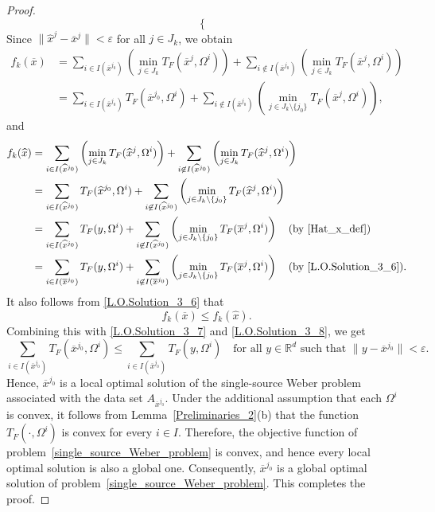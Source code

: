 \documentclass[sn-mathphys-num]{sn-jnl}%
\def\Hat{\widehat}
\theoremstyle{definition}
\begin{document}
\begin{proof}
\begin{equation}
\begin{cases}
	\end{cases}
    \end{equation}
    Since $\|\Hat{x}^j-\overline{x}^j\|<\varepsilon$ for all $j \in J_k$, we obtain
	\begin{equation}
		\label{L.O.Solution_3_7}
		\begin{aligned}
			f_k(\overline{x})&=\sum_{i \in I(\overline{x}^{j_0})}\left(\min_{j \in J_k}T_F(\overline{x}^j,\Omega^i) \right)+\sum_{i \not\in I(\overline{x}^{j_0})}\left(\min_{j \in J_k}T_F(\overline{x}^j,\Omega^i) \right)\\
			&=\sum_{i \in I(\overline{x}^{j_0})}T_F(\overline{x}^{j_0},\Omega^i) +\sum_{i \not\in I(\overline{x}^{j_0})}\left(\min_{j \in J_k\setminus \{j_0\}}T_F(\overline{x}^j,\Omega^i) \right),
		\end{aligned}
	\end{equation}
	and
	\begin{equation}
		\label{L.O.Solution_3_8}
		\begin{aligned}
			f_k(\Hat{x})    &=\sum_{i \in I(\Hat{x}^{j_0})}\left(\min_{j \in J_k}T_F(\Hat{x}^j,\Omega^i) \right)+\sum_{i \not\in I(\Hat{x}^{j_0})}\left(\min_{j \in J_k}T_F(\Hat{x}^j,\Omega^i) \right)\\
            &=\sum_{i \in I(\Hat{x}^{j_0})}T_F(\Hat{x}^{j_0},\Omega^i) +\sum_{i \not\in I(\Hat{x}^{j_0})}\left(\min_{j \in J_k\setminus\{j_0\}}T_F(\Hat{x}^j,\Omega^i) \right)\\
			&=\sum_{i \in I(\Hat{x}^{j_0})}T_F(y,\Omega^i)+\sum_{i \not\in I(\Hat{x}^{j_0})}\left(\min_{j \in J_k\setminus\{j_0\}}T_F(\overline{x}^j,\Omega^i) \right) \quad (\text{by \eqref{Hat_x_def}})\\
			&=\sum_{i \in I(\overline{x}^{j_0})}T_F(y,{\Omega^i})+\sum_{i \not\in I(\overline{x}^{j_0})}\left(\min_{j \in J_k \setminus \{j_0\}}T_F(\overline{x}^j,{\Omega^i}) \right) \quad (\text{by \eqref{L.O.Solution_3_6}}).
		\end{aligned}
	\end{equation}
    It also follows from \eqref{L.O.Solution_3_6} that
	\[
	f_k(\overline{x}) \le f_k(\Hat{x}).
	\]
	Combining this with \eqref{L.O.Solution_3_7} and \eqref{L.O.Solution_3_8}, we get
	\[
	\sum_{i \in I(\overline{x}^{j_0})} T_F(\overline{x}^{j_0},\Omega^i) \le \sum_{i \in I(\overline{x}^{j_0})} T_F(y,\Omega^i) 
	\quad \text{for all } y \in \mathbb{R}^d \text{ such that } \|y-\overline{x}^{j_0}\|<\varepsilon.
	\]
	Hence, $\overline{x}^{j_0}$ is a local optimal solution of the single-source Weber problem associated with the data set $A_{\overline{x}^{j_0}}$. Under the additional assumption that each $\Omega^i$ is convex, it follows from Lemma~\ref{Preliminaries_2}(b) that the function $T_F(\cdot,\Omega^i)$ is convex for every $i\in I$. Therefore, the objective function of problem~\eqref{single_source_Weber_problem} is convex, and hence every local optimal solution is also a global one. Consequently, $\overline{x}^{j_0}$ is a global optimal solution of problem~\eqref{single_source_Weber_problem}. This completes the proof.
\end{proof}
\end{document}
